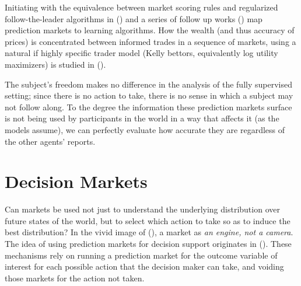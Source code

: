 

Initiating with the equivalence between market scoring rules and regularized follow-the-leader algorithms in (\cite{chen2010new}) and a series of follow up works (\cite{abernethy2013efficient, frongillo2012interpreting, hu2014multi, frongillo2015convergence}) map prediction markets to learning algorithms. 
How the wealth (and thus accuracy of prices) is concentrated between informed trades in a sequence of markets, using a natural if highly specific trader model (Kelly bettors, equivalently log utility maximizers) is studied in (\cite{beygelzimer2012learning}).

The subject's freedom makes no difference in the analysis of the fully supervised setting; since there is no action to take, there is no sense in which a subject may not follow along. To the degree the information these prediction markets surface is not being used by participants in the world in a way that affects it (as the models assume), we can perfectly evaluate how accurate they are regardless of the other agents' reports.


\section{Decision Markets}

Can markets be used not just to understand the underlying distribution over future states of the world, but to select which action to take so as to induce the best distribution? In the vivid image of (\cite{mackenzie2008engine}), a market as \emph{an engine, not a camera}.
The idea of using prediction markets for decision support originates in (\cite{berg2003prediction,hanson2002decision}). 
These mechanisms rely on running a prediction market for the outcome variable of interest for each possible action that the decision maker can take, and voiding those markets for the action not taken.

